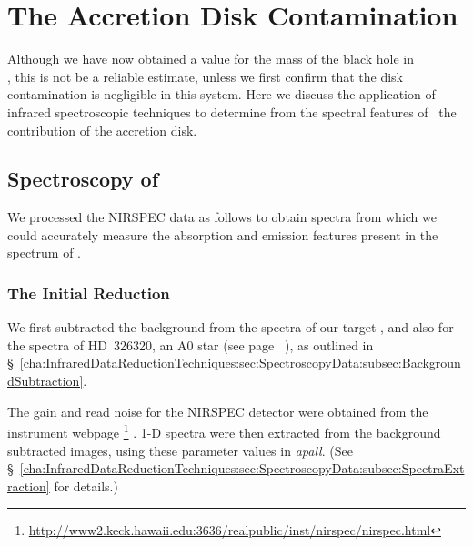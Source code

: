 
\chapter{The Accretion Disk Contamination}\label{cha:AccretionDiskContamination}

Although we have now obtained a value for the mass of the black hole in \\%
\groj, this is not  be a reliable estimate, unless we first confirm that the disk contamination is negligible in this system.
Here we discuss the application of infrared spectroscopic techniques to determine from the spectral features of \groj\ the contribution of the accretion disk. %


\section{Spectroscopy of \groj}\label{cha:AccretionDiskContamination:sec:Spectroscopy}

We processed the NIRSPEC data as follows to obtain spectra from which we could accurately measure the absorption and emission features present in the spectrum of \groj.


\subsection{The Initial Reduction}\label{cha:AccretionDiskContamination:sec:Spectroscopy:subsec:InitialReduction}

We first subtracted the background from the spectra of our target \groj, and also for the spectra
of \mbox{HD 326320}, an A0 star (see page~%
\pageref{cha:GROJ1655-40:sec:ObservationsOfJ1655:subsec:DetailsOfTheObservations:subsubsec:2000Spectroscopy}%
), as outlined in \S~\ref{cha:InfraredDataReductionTechniques:sec:SpectroscopyData:subsec:BackgroundSubtraction}. %

\vspace{\myparskip}

The gain and read noise for the NIRSPEC detector were
obtained from the instrument webpage%
\footnote{\label{cha:AccretionDiskContamination:sec:Spectroscopy:subsec:InitialReduction:foot:Nirspec}
\url{http://www2.keck.hawaii.edu:3636/realpublic/inst/nirspec/nirspec.html} }%
. 1-D spectra were then extracted from the background subtracted images, using
these parameter values in \textit{apall}. (See \S~\ref{cha:InfraredDataReductionTechniques:sec:SpectroscopyData:subsec:SpectraExtraction} for details.) %

